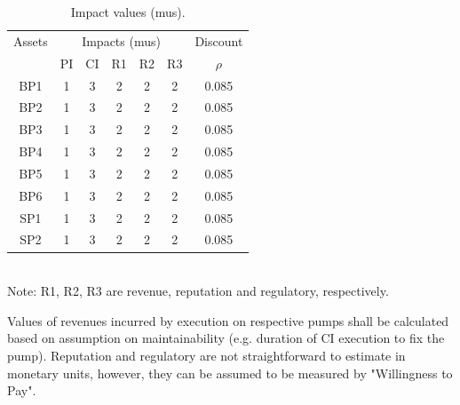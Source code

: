 \begin{table}[h]
	\caption{Impact values (mus).}
	\label{ch05_tbl_impactvalue01}
	{\footnotesize
\begin{tabular}{c|c|c|c|c|c|c}
	\hline
	Assets & \multicolumn{5}{c|}{Impacts (mus)} & Discount \\ 
	\cline{2-6}
	& PI & CI & R1 & R2 & R3 & $\rho$ \\ 
	\hline
	BP1 & 1 & 3 & 2 & 2 & 2 & 0.085 \\ 
	BP2 & 1 & 3 & 2 & 2 & 2 & 0.085 \\ 
	BP3 & 1 & 3 & 2 & 2 & 2 & 0.085 \\ 
	BP4 & 1 & 3 & 2 & 2 & 2 & 0.085 \\ 
	BP5 & 1 & 3 & 2 & 2 & 2 & 0.085 \\ 
	BP6 & 1 & 3 & 2 & 2 & 2 & 0.085 \\ 
	SP1 & 1 & 3 & 2 & 2 & 2 & 0.085 \\ 
	SP2 & 1 & 3 & 2 & 2 & 2 & 0.085 \\ 
	\hline
\end{tabular}\\
Note: R1, R2, R3 are revenue, reputation and regulatory, respectively.
	}
\end{table}

Values of revenues incurred by execution on respective pumps shall be calculated based on assumption on maintainability (e.g. duration of CI execution to fix the pump). Reputation and regulatory are not straightforward to estimate in monetary units, however, they can be assumed to be measured by "Willingness to Pay". 

